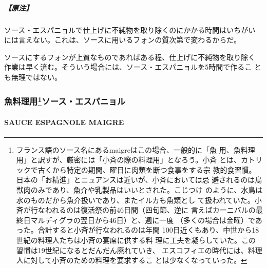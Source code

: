 \hypertarget{ux539fux6ce8}{%
\subparagraph{【原注】}\label{ux539fux6ce8}}

ソース・エスパニョルで仕上げに不純物を取り除くのにかかる時間はいちがい
には言えない。これは、ソースに用いるフォンの質次第で変わるからだ。

ソースにするフォンが上質なものであればある程、仕上げに不純物を取り除く
作業は早く済む。そういう場合には、ソース・エスパニョルを5時間で作るこ
とも無理ではない。

\maeaki

\hypertarget{ux9b5aux6599ux7406ux75280102006ux30bdux30fcux30b9ux30a8ux30b9ux30d1ux30cbux30e7ux30eb}{%
\subsubsection[魚料理用ソース・エスパニョル]{\texorpdfstring{魚料理用\footnote{フランス語のソース名にあるmaigreはこの場合、一般的に「魚
  用、魚料理用」と訳すが、厳密には「小斉の際の料理用」となろう。小斉
  とは、カトリックで古くから特定の期間、曜日に肉類を断つ食事をする宗
  教的食習慣。日本の「お精進」とニュアンスは近いが、小斉においては忌
  避されるのは鳥獣肉のみであり、魚介や乳製品はいいとされた。こじつけ
  のように、水鳥は水のものだから魚介扱いであり、またイルカも魚類とし
  て扱われていた。小斉が行なわれるのは復活祭の前46日間（四旬節、逆に
  言えばカーニバルの最終日マルディグラの翌日から46日）と、週に一度
  （多くの場合は金曜）であった。合計すると小斉が行なわれるのは年間
  100日近くもあり、中世から18世紀の料理人たちは小斉の宴席に供する料
  理に工夫を凝らしていた。この習慣は19世紀になるとだんだん廃れていき、
  エスコフィエの時代には、料理人に対して小斉のための料理を要求するこ
  とは少なくなっていった。}ソース・エスパニョル}{魚料理用ソース・エスパニョル}}\label{ux9b5aux6599ux7406ux75280102006ux30bdux30fcux30b9ux30a8ux30b9ux30d1ux30cbux30e7ux30eb}}

\hypertarget{sauce-espagnole-maigre}{%
\paragraph{SAUCE ESPAGNOLE MAIGRE}\label{sauce-espagnole-maigre}}


